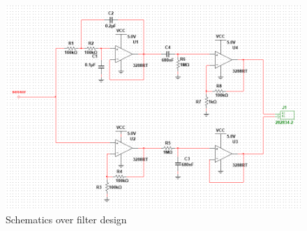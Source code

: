 \begin{figure}[H]
	\includegraphics[width = \textwidth]{billeder/filterSchematics.png}
	\caption{Schematics over filter design}\label{fig:filterschematics}
\end{figure}